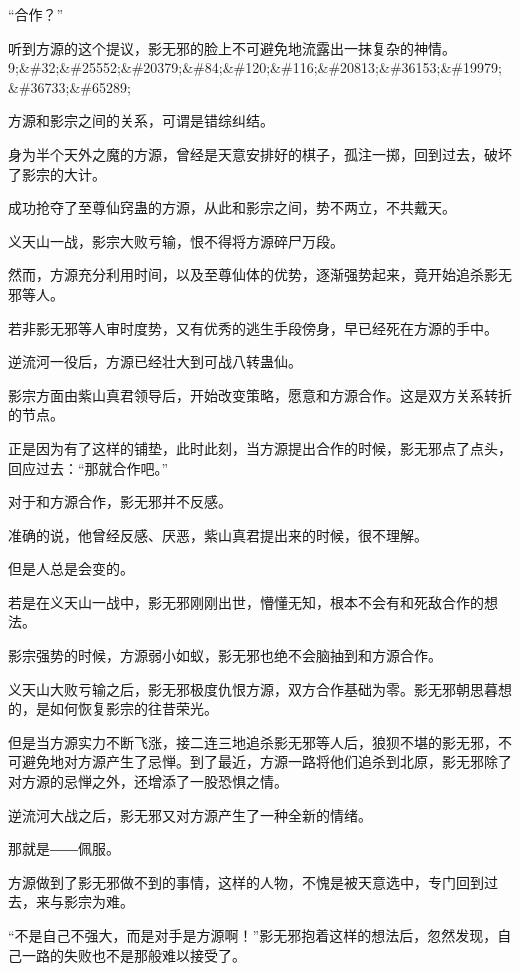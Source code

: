 
\begin{this_body}

“合作？”

听到方源的这个提议，影无邪的脸上不可避免地流露出一抹复杂的神情。9;\&\#32;\&\#25552;\&\#20379;\&\#84;\&\#120;\&\#116;\&\#20813;\&\#36153;\&\#19979;\&\#36733;\&\#65289;

方源和影宗之间的关系，可谓是错综纠结。

身为半个天外之魔的方源，曾经是天意安排好的棋子，孤注一掷，回到过去，破坏了影宗的大计。

成功抢夺了至尊仙窍蛊的方源，从此和影宗之间，势不两立，不共戴天。

义天山一战，影宗大败亏输，恨不得将方源碎尸万段。

然而，方源充分利用时间，以及至尊仙体的优势，逐渐强势起来，竟开始追杀影无邪等人。

若非影无邪等人审时度势，又有优秀的逃生手段傍身，早已经死在方源的手中。

逆流河一役后，方源已经壮大到可战八转蛊仙。

影宗方面由紫山真君领导后，开始改变策略，愿意和方源合作。这是双方关系转折的节点。

正是因为有了这样的铺垫，此时此刻，当方源提出合作的时候，影无邪点了点头，回应过去：“那就合作吧。”

对于和方源合作，影无邪并不反感。

准确的说，他曾经反感、厌恶，紫山真君提出来的时候，很不理解。

但是人总是会变的。

若是在义天山一战中，影无邪刚刚出世，懵懂无知，根本不会有和死敌合作的想法。

影宗强势的时候，方源弱小如蚁，影无邪也绝不会脑抽到和方源合作。

义天山大败亏输之后，影无邪极度仇恨方源，双方合作基础为零。影无邪朝思暮想的，是如何恢复影宗的往昔荣光。

但是当方源实力不断飞涨，接二连三地追杀影无邪等人后，狼狈不堪的影无邪，不可避免地对方源产生了忌惮。到了最近，方源一路将他们追杀到北原，影无邪除了对方源的忌惮之外，还增添了一股恐惧之情。

逆流河大战之后，影无邪又对方源产生了一种全新的情绪。

那就是――佩服。

方源做到了影无邪做不到的事情，这样的人物，不愧是被天意选中，专门回到过去，来与影宗为难。

“不是自己不强大，而是对手是方源啊！”影无邪抱着这样的想法后，忽然发现，自己一路的失败也不是那般难以接受了。


\end{this_body}
